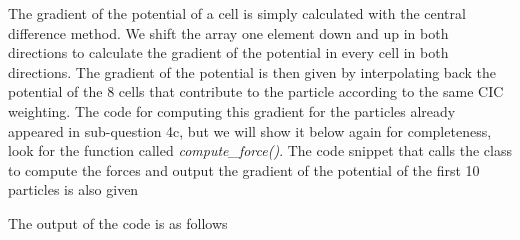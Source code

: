 The gradient of the potential of a cell is simply calculated with the central difference method. We shift the array one element down and up in both directions to calculate the gradient of the potential in every cell in both directions. The gradient of the potential is then given by interpolating back the potential of the 8 cells that contribute to the particle according to the same CIC weighting. The code for computing this gradient for the particles already appeared in sub-question 4c, but we will show it below again for completeness, look for the function called \textit{compute\_force()}. The code snippet that calls the class to compute the forces and output the gradient of the potential of the first 10 particles is also given



The output of the code is as follows


